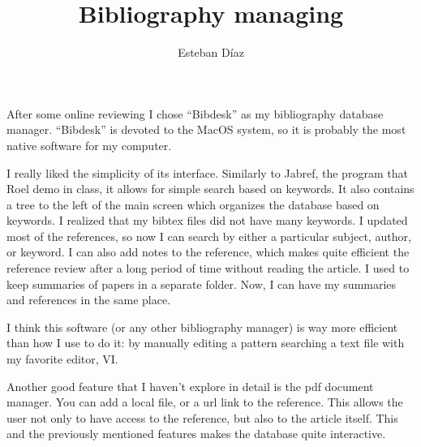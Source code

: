 \documentclass[11pt]{article}
\author{Esteban D\'{i}az}
\title{Bibliography managing}{}
\begin{document}
%
\maketitle

After some online reviewing I chose ``Bibdesk'' as my bibliography database manager. 
 ``Bibdesk'' is devoted to the MacOS system, so it is probably the most native software 
for my computer. 

I really liked the simplicity of its interface. Similarly to Jabref, the program that Roel demo
in class, it allows for simple search based on keywords. It also contains a tree to the left of the 
main screen which organizes the database based on keywords. I realized that my bibtex files
 did not have many keywords. I updated most of the references, so now I can search by either
a particular subject, author, or keyword. I can also add notes to the reference, which makes 
quite efficient the reference review after a long period of time without reading the
article. I used to keep summaries of papers in a separate folder. Now, I can have my summaries
and references in the same place. 

I think this software (or any other bibliography manager) is way more efficient than how
I use to do it: by manually editing a pattern searching a text file with my favorite editor, VI. 

Another good feature that I haven't explore in detail is the pdf document manager. You can add a local
file, or a url link to the reference. This allows the user not only to have access to the reference, 
but also to the article itself. This and the previously mentioned features makes the database quite interactive. 
\end{document}
